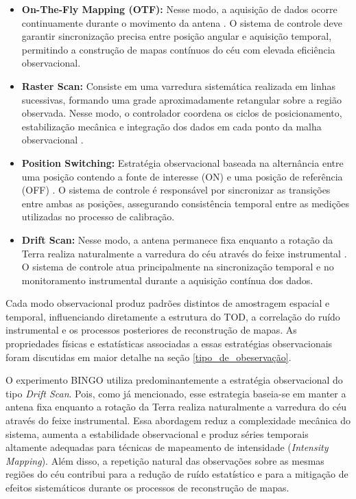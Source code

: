 \begin{itemize}

    \item \textbf{On-The-Fly Mapping (OTF):} 
    Nesse modo, a aquisição de dados ocorre continuamente durante o movimento da antena \cite{GBTog2011_green, MangumEmersonGreisen2007_on_the_fly}. O sistema de controle deve garantir sincronização precisa entre posição angular e aquisição temporal, permitindo a construção de mapas contínuos do céu com elevada eficiência observacional.

    \item \textbf{Raster Scan:}
    Consiste em uma varredura sistemática realizada em linhas sucessivas, formando uma grade aproximadamente retangular sobre a região observada. Nesse modo, o controlador coordena os ciclos de posicionamento, estabilização mecânica e integração dos dados em cada ponto da malha observacional \cite{INAF_MappingTechniques_raster}.

    \item \textbf{Position Switching:}
    Estratégia observacional baseada na alternância entre uma posição contendo a fonte de interesse (ON) e uma posição de referência (OFF) \cite{GBTog2011_green}. O sistema de controle é responsável por sincronizar as transições entre ambas as posições, assegurando consistência temporal entre as medições utilizadas no processo de calibração.

    \item \textbf{Drift Scan:} Nesse modo, a antena permanece fixa enquanto a rotação da Terra realiza naturalmente a varredura do céu através do feixe instrumental \cite{chatterjee2023driftscan}. O sistema de controle atua principalmente na sincronização temporal e no monitoramento instrumental durante a aquisição contínua dos dados.

\end{itemize}

Cada modo observacional produz padrões distintos de amostragem espacial e temporal, influenciando diretamente a estrutura do TOD, a correlação do ruído instrumental e os processos posteriores de reconstrução de mapas. As propriedades físicas e estatísticas associadas a essas estratégias observacionais foram discutidas em maior detalhe na seção \ref{tipo_de_obeservação}.

O experimento BINGO  utiliza  predominantemente a estratégia observacional do tipo \textit{Drift Scan}. Pois, como já mencionado, esse estrategia baseia-se em manter a antena fixa enquanto a rotação da Terra realiza naturalmente a varredura do céu através do feixe instrumental. Essa abordagem reduz a complexidade mecânica do sistema, aumenta a estabilidade observacional e produz séries temporais altamente adequadas para técnicas de mapeamento de intensidade (\textit{Intensity Mapping}). Além disso, a repetição natural das observações sobre as mesmas regiões do céu contribui para a redução de ruído estatístico e para a mitigação de efeitos sistemáticos durante os processos de reconstrução de mapas.

